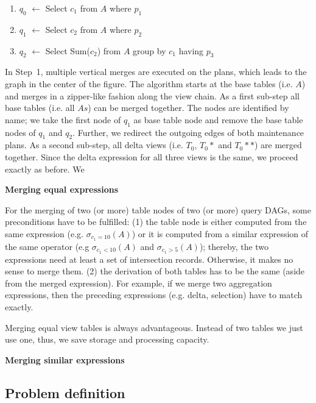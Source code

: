 \begin{enumerate}
	\item $q_0$ $\leftarrow$ Select $c_1$ from $A$ where $p_1$ 
	\item $q_1$ $\leftarrow$ Select $c_2$ from $A$ where $p_2$ 
	\item $q_2$ $\leftarrow$ Select Sum($c_2$) from $A$ group by $c_1$ having $p_3$
\end{enumerate}


In Step~1, multiple vertical merges are executed on the plans, which
leads to the graph in the center of the figure. The algorithm starts
at the base tables (i.e. $A$) and merges in a zipper-like fashion 
along the view chain. As a first sub-step all base tables (i.e. all $As$) 
can be merged together. The nodes are identified by name; we take the
first node of $q_1$ as base table node and remove the base table nodes
of $q_1$ and $q_2$. Further, we redirect the outgoing edges of both 
maintenance plans.
As a second sub-step, all delta views (i.e. $T_0$,
$T_0*$ and $T_0**$) are merged together. Since the delta expression 
for all three views is the same, we proceed exactly as before. We
 


\noindent
\textbf{Merging equal expressions}





For the merging of two (or more) table nodes of two (or more) query DAGs,
some preconditions have to be fulfilled: (1) the table node is either
computed from the same expression (e.g. $\sigma_{c_1 = 10}(A)$) or it is
computed from a similar expression of the same operator (e.g $\sigma_{c_1 
< 10}(A)$ and $\sigma_{c_1 > 5}(A)$); thereby, the two expressions need
at least a set of intersection records. Otherwise, it makes no sense to
merge them. (2) the derivation of both tables has to be the same (aside 
from the merged expression). For example, if we merge two aggregation
expressions, then the preceding expressions (e.g. delta, selection) have 
to match exactly.   



Merging equal view tables is always advantageous. Instead of two tables
we just use one, thus, we save storage and processing capacity. 

\noindent
\textbf{Merging similar expressions}


\subsection{Problem definition}

